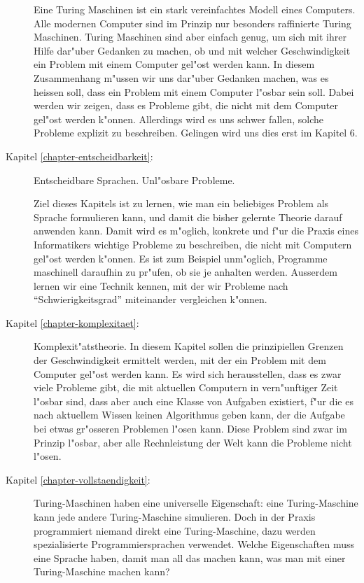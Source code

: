 \begin{description}
Eine Turing Maschinen ist ein stark vereinfachtes Modell eines Computers.
Alle modernen Computer sind im Prinzip nur besonders raffinierte Turing Maschinen.
Turing Maschinen sind aber einfach genug, um sich mit ihrer Hilfe dar"uber Gedanken
zu machen, ob und mit welcher Geschwindigkeit ein Problem mit einem
Computer gel"ost werden kann. In diesem Zusammenhang m"ussen wir uns
dar"uber Gedanken machen, was es heissen soll, dass ein Problem mit
einem Computer l"osbar sein soll. Dabei werden wir zeigen, dass es Probleme
gibt, die nicht mit dem Computer gel"ost werden k"onnen. Allerdings wird
es uns schwer fallen, solche Probleme explizit zu beschreiben. 
Gelingen wird uns dies erst im Kapitel 6.

\item[Kapitel \ref{chapter-entscheidbarkeit}:] Entscheidbare Sprachen. Unl"osbare Probleme.

Ziel dieses Kapitels ist zu lernen, wie man ein beliebiges Problem als
Sprache formulieren kann, und damit die bisher gelernte Theorie darauf
anwenden kann. Damit wird es m"oglich, konkrete und f"ur die Praxis eines
Informatikers wichtige Probleme zu beschreiben, die
nicht mit Computern gel"ost werden k"onnen.
Es ist zum Beispiel unm"oglich, Programme maschinell daraufhin
zu pr"ufen, ob sie je anhalten werden.
Ausserdem lernen wir eine Technik kennen, mit der wir Probleme 
nach ``Schwierigkeitsgrad'' miteinander vergleichen k"onnen. 

\item[Kapitel \ref{chapter-komplexitaet}:] Komplexit"atstheorie. In diesem Kapitel sollen 
die prinzipiellen Grenzen der Geschwindigkeit ermittelt werden,
mit der ein Problem mit dem Computer gel"ost werden kann. Es wird sich
herausstellen, dass es zwar viele Probleme gibt, die mit aktuellen Computern in
vern"unftiger Zeit l"osbar sind, dass aber auch eine Klasse von Aufgaben
existiert, f"ur die es nach aktuellem Wissen keinen Algorithmus geben kann,
der die Aufgabe bei etwas gr"osseren Problemen l"osen kann. Diese Problem sind
zwar im Prinzip l"osbar, aber alle Rechnleistung der Welt kann die Probleme nicht l"osen.

\item[Kapitel \ref{chapter-vollstaendigkeit}:]
Turing-Maschinen haben eine universelle Eigenschaft: eine Turing-Maschine
kann jede andere Turing-Maschine simulieren. Doch in der Praxis
programmiert niemand direkt eine Turing-Maschine, dazu werden
spezialisierte Programmiersprachen verwendet.
Welche Eigenschaften muss eine Sprache haben, damit
man all das machen kann, was man mit einer Turing-Maschine
machen kann?
\end{description}


